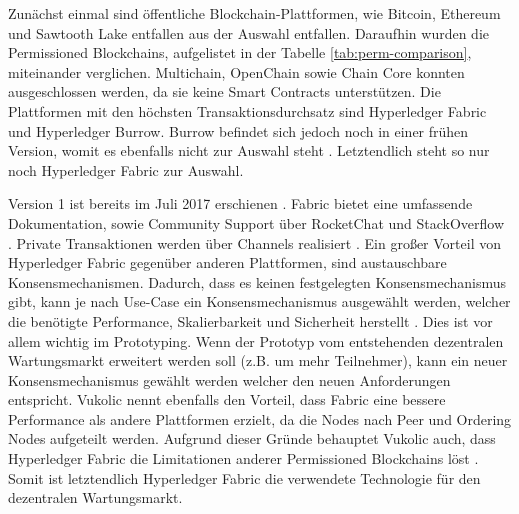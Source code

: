 Zunächst einmal sind öffentliche Blockchain-Plattformen, wie Bitcoin, Ethereum und Sawtooth Lake entfallen aus der Auswahl entfallen. Daraufhin wurden die Permissioned Blockchains, aufgelistet in der Tabelle \ref{tab:perm-comparison}, miteinander verglichen. Multichain, OpenChain sowie Chain Core konnten ausgeschlossen werden, da sie keine Smart Contracts unterstützen. Die Plattformen mit den höchsten Transaktionsdurchsatz sind Hyperledger Fabric und Hyperledger Burrow. Burrow befindet sich jedoch noch in einer frühen Version, womit es ebenfalls nicht zur Auswahl steht \cite{HyperledgerFabricTeamHyperledgerFabricReleases2018}. Letztendlich steht so nur noch Hyperledger Fabric zur Auswahl. 

Version 1 ist bereits im Juli 2017 erschienen \cite{HyperledgerFabricTeamHyperledgerFabricReleases2018}. Fabric bietet eine umfassende Dokumentation, sowie Community Support über RocketChat und StackOverflow \cite{HyperledgerFabricTeamSupportHyperledgerFabric}. Private Transaktionen werden über Channels realisiert \cite{SchererPerformanceScalabilityBlockchain2017}. Ein großer Vorteil von Hyperledger Fabric gegenüber anderen Plattformen, sind austauschbare Konsensmechanismen. Dadurch, dass es keinen festgelegten Konsensmechanismus gibt, kann je nach Use-Case ein Konsensmechanismus ausgewählt werden, welcher die benötigte Performance, Skalierbarkeit und Sicherheit herstellt \cite{VukolicRethinkingPermissionedBlockchains2017}. Dies ist vor allem wichtig im Prototyping. Wenn der Prototyp vom entstehenden dezentralen Wartungsmarkt erweitert werden soll (z.B. um mehr Teilnehmer), kann ein neuer Konsensmechanismus gewählt werden welcher den neuen Anforderungen entspricht. Vukolic nennt ebenfalls den Vorteil, dass Fabric eine bessere Performance als andere Plattformen erzielt, da die Nodes nach Peer und Ordering Nodes aufgeteilt werden. Aufgrund dieser Gründe behauptet Vukolic auch, dass Hyperledger Fabric die Limitationen anderer Permissioned Blockchains löst \cite{VukolicRethinkingPermissionedBlockchains2017}. Somit ist letztendlich Hyperledger Fabric die verwendete Technologie für den dezentralen Wartungsmarkt.

